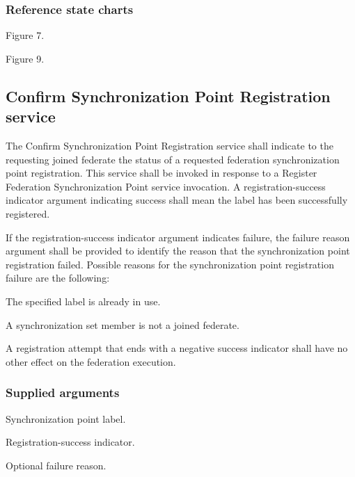 \subsubsection{Reference state charts}

\begin{stdalphalist}
    \item Figure 7.
    \item Figure 9.
\end{stdalphalist}

\subsection{Confirm Synchronization Point Registration \rtiinitiated{} service}

The Confirm Synchronization Point Registration \rtiinitiated{} service shall indicate to the requesting joined federate the status of a requested federation synchronization point registration. This service shall be invoked in response to a Register Federation Synchronization Point service invocation. A registration-success indicator argument indicating success shall mean the label has been successfully registered.

If the registration-success indicator argument indicates failure, the failure reason argument shall be provided to identify the reason that the synchronization point registration failed. Possible reasons for the synchronization point registration failure are the following:

\begin{stddashlist}
    \item The specified label is already in use.
    \item A synchronization set member is not a joined federate.
\end{stddashlist}

A registration attempt that ends with a negative success indicator shall have no other effect on the federation execution.

\subsubsection{Supplied arguments}

\begin{stdalphalist}
    \item Synchronization point label.
    \item Registration-success indicator.
    \item Optional failure reason.
\end{stdalphalist}

